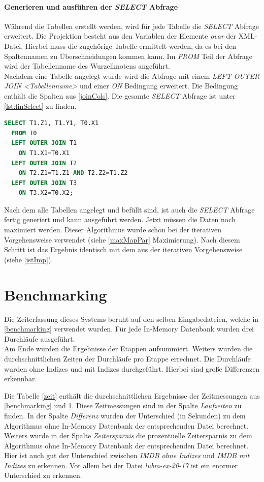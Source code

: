 \documentclass[draft,final]{vutinfth} %
\begin{document}
\paragraph{Generieren und ausführen der \textit{SELECT} Abfrage}
Während die Tabellen erstellt werden, wird für jede Tabelle die \textit{SELECT} Abfrage erweitert. Die Projektion besteht aus den Variablen der Elemente \textit{ovar} der XML-Datei. Hierbei muss die zugehörige Tabelle ermittelt werden, da es bei den Spaltennamen zu Überschneidungen kommen kann. Im \textit{FROM} Teil der Abfrage wird der Tabellenname des Wurzelknotens angeführt. \\
Nachdem eine Tabelle angelegt wurde wird die Abfrage mit einem \textit{LEFT OUTER JOIN <Tabellenname>} und einer \textit{ON} Bedingung erweitert. Die Bedingung enthält die Spalten aus \ref{joinCols}. Die gesamte \textit{SELECT} Abfrage ist unter \ref{lst:finSelect} zu finden.

\begin{lstlisting}[language=SQL,label={lst:finSelect},caption={SELECT Abfrage},frame = single]
SELECT T1.Z1, T1.Y1, T0.X1
  FROM T0
  LEFT OUTER JOIN T1
	ON T1.X1=T0.X1 
  LEFT OUTER JOIN T2
	ON T2.Z1=T1.Z1 AND T2.Z2=T1.Z2 
  LEFT OUTER JOIN T3
	ON T3.X2=T0.X2;
\end{lstlisting}

Nach dem alle Tabellen angelegt und befüllt sind, ist auch die \textit{SELECT} Abfrage fertig generiert und kann ausgeführt werden. Jetzt müssen die Daten noch maximiert werden. Dieser Algorithmus wurde schon bei der iterativen Vorgehensweise verwendet (siehe \ref{maxMapPar} Maximierung). Nach diesem Schritt ist das Ergebnis identisch mit dem aus der iterativen Vorgehensweise (siehe \ref{istImp}).

\section{Benchmarking} \label{benchNeu}
Die Zeiterfassung dieses Systems beruht auf den selben Eingabedateien, welche in \ref{benchmarking} verwendet wurden. Für jede In-Memory Datenbank wurden drei Durchläufe ausgeführt. \\
Am Ende wurden die Ergebnisse der Etappen aufsummiert. Weiters wurden die durchschnittlichen Zeiten der Durchläufe pro Etappe errechnet. Die Durchläufe wurden ohne Indizes und mit Indizes durchgeführt. Hierbei sind gro\ss e Differenzen erkennbar.

Die Tabelle \ref{zeit} enthält die durchschnittlichen Ergebnisse der Zeitmessungen aus \ref{benchmarking} und \ref{benchNeu}. Diese Zeitmessungen sind in der Spalte \textit{Laufzeiten} zu finden. In der Spalte \textit{Differenz} wurden der Unterschied (in Sekunden) zu dem Algorithmus ohne In-Memory Datenbank der entsprechenden Datei berechnet. Weiters wurde in der Spalte \textit{Zeitersparnis} die prozentuelle Zeitersparnis zu dem Algorithmus ohne In-Memory Datenbank der entsprechenden Datei berechnet. \\
Hier ist auch gut der Unterschied zwischen \textit{IMDB ohne Indizes} und \textit{IMDB mit Indizes} zu erkennen. Vor allem bei der Datei \textit{lubm-ex-20-17} ist ein enormer Unterschied zu erkennen.
\end{document}
